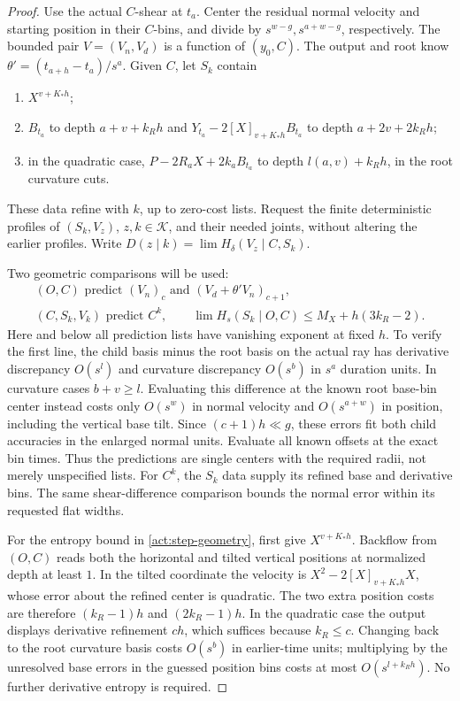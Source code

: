 \begin{proof}
Use the actual $C$-shear at $t_a$.  Center the residual normal
velocity and starting position in their $C$-bins, and divide by
$s^{w-g},s^{a+w-g}$, respectively.  The bounded pair
$V=(V_n,V_d)$ is a function of $(y_0,C)$.  The output and root
know $\theta'=(t_{a+h}-t_a)/s^a$.  Given $C$, let $S_k$ contain
\begin{enumerate}[label=\textup{(\roman*)}]
\item $X^{v+K_*h}$;
\item $B_{t_a}$ to depth $a+v+k_Rh$ and
$Y_{t_a}-2[X]_{v+K_*h}B_{t_a}$ to depth $a+2v+2k_Rh$;
\item in the quadratic case,
$P-2R_aX+2k_aB_{t_a}$ to depth $l(a,v)+k_Rh$, in the root curvature cuts.
\end{enumerate}
These data refine with $k$, up to zero-cost lists.  Request the
finite deterministic profiles of $(S_k,V_z)$, $z,k\in\mathcal K$,
and their needed joints, without altering the earlier profiles.
Write $D(z\mid k)=\lim H_\delta(V_z\mid C,S_k)$.

Two geometric comparisons will be used:
\begin{equation}\label{act:step-geometry}
\begin{gathered}
 (O,C)\text{ predict }(V_n)_c
       \text{ and }(V_d+\theta'V_n)_{c+1},\\
 (C,S_k,V_k)\text{ predict }C^k,\qquad
 \lim H_s(S_k\mid O,C)\le M_X+h(3k_R-2).
\end{gathered}
\end{equation}
Here and below all prediction lists have vanishing exponent at
fixed $h$.  To verify the first line, the child basis minus the
root basis on the actual ray has derivative discrepancy $O(s^l)$
and curvature discrepancy $O(s^b)$ in $s^a$ duration units.
In curvature cases $b+v\ge l$.  Evaluating this difference at
the known root base-bin center instead costs only $O(s^w)$ in
normal velocity and $O(s^{a+w})$ in position, including the
vertical base tilt.  Since $(c+1)h\ll g$, these errors fit both
child accuracies in the enlarged normal units.  Evaluate all
known offsets at the exact bin times.  Thus the predictions are
single centers with the required radii, not merely unspecified
lists.  For $C^k$, the $S_k$ data supply its refined base and
derivative bins.  The same shear-difference comparison bounds the
normal error within its requested flat widths.

For the entropy bound in \eqref{act:step-geometry}, first give
$X^{v+K_*h}$.  Backflow from $(O,C)$ reads both the horizontal and
tilted vertical positions at normalized depth at least $1$.
In the tilted coordinate the velocity is
$X^2-2[X]_{v+K_*h}X$, whose error about the refined center is
quadratic.  The two extra position costs are therefore
$(k_R-1)h$ and $(2k_R-1)h$.  In the quadratic case the output
displays derivative refinement $ch$, which suffices because
$k_R\le c$.  Changing back to the root curvature basis costs
$O(s^b)$ in earlier-time units; multiplying by the unresolved
base errors in the guessed position bins costs at most
$O(s^{l+k_Rh})$.  No further derivative entropy is required.


\end{proof}
